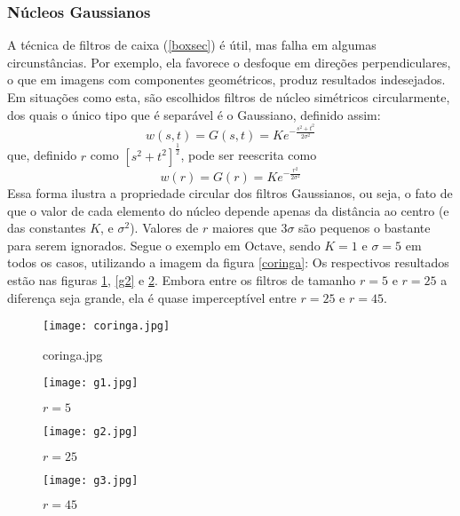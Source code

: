 \documentclass[a4paper,12pt,twoside]{article}
\begin{document}
\subsubsection{Núcleos Gaussianos}
A técnica de filtros de caixa (\ref{boxsec}) é útil, mas falha em algumas circunstâncias. 
Por exemplo, ela favorece o desfoque em direções perpendiculares, o que em imagens com componentes geométricos, produz resultados indesejados.
Em situações como esta, são escolhidos filtros de núcleo simétricos circularmente, dos quais o único tipo que é separável é o Gaussiano, definido assim:
\begin{equation}
    w(s,t) = G(s,t) = Ke^{-\frac{s^2+t^2}{2\sigma^2}}
\end{equation}
que, definido \(r\) como \([s^2+t^2]^{\frac{1}{2}}\), pode ser reescrita como 
\begin{equation}
    w(r) = G(r) = Ke^{-\frac{r^2}{2\sigma^2}}
\end{equation}
Essa forma ilustra a propriedade circular dos filtros Gaussianos, ou seja, o fato de que o valor de cada elemento do núcleo depende apenas da distância ao centro (e das constantes \(K\), e \(\sigma^2\)).
Valores de \(r\) maiores que \(3\sigma\) são pequenos o bastante para serem ignorados.
Segue o exemplo em Octave, sendo \(K = 1\) e \(\sigma = 5\) em todos os casos, utilizando a imagem da figura \ref{coringa}:
Os respectivos resultados estão nas figuras \ref{g1}, \ref{g2} e \ref{g3}.
Embora entre os filtros de tamanho \(r = 5\) e \(r = 25\) a diferença seja grande, ela é quase imperceptível entre \(r = 25\) e \(r = 45\).


\begin{figure}[h]
    \centering
    \begin{minipage}{0.48\textwidth}
        \centering
  \texttt{[image: coringa.jpg]}
    \caption{coringa.jpg}\label{coringa}
    \end{minipage}
    \begin{minipage}{0.48\textwidth}
        \centering
  \texttt{[image: g1.jpg]}
        \caption{\(r = 5\)}\label{g1}
    \end{minipage}
\end{figure}
\begin{figure}[h!]
    \centering
    \begin{minipage}{0.48\textwidth}
        \centering
  \texttt{[image: g2.jpg]}
        \caption{\(r = 25\)}\label{g2}
    \end{minipage}
    \begin{minipage}{0.48\textwidth}
        \centering
  \texttt{[image: g3.jpg]}
        \caption{\(r = 45\)}\label{g3}
    \end{minipage}
\end{figure}
\end{document}
